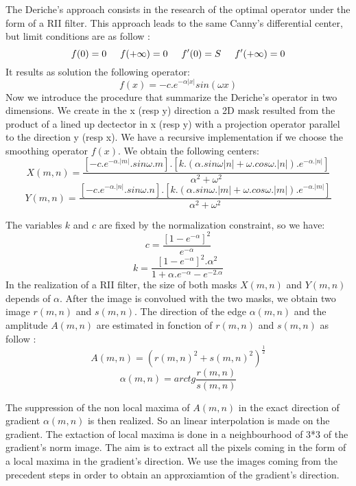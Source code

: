 The Deriche's approach consists in the research of the optimal operator under the form of a RII filter. This approach leads to the same Canny's differential center, but limit conditions are as follow :
\[
f(0)=0 \hspace{0.5cm}  f(+\infty)=0 \hspace{0.5cm}  f'(0)=S \hspace{0.5cm}  f'(+\infty)=0 
\]
It results as solution the following operator:
\[
f(x) = -c.e^{-\alpha |x|}sin(\omega x) 
\]
Now we introduce the procedure that summarize the Deriche's operator in two dimensions. We create in the x (resp y) direction a 2D mask resulted from the product of a lined up dectector in x (resp y) with a projection operator parallel to the direction y (resp x). We have a recursive implementation if we choose the smoothing operator $f(x)$.
We obtain the following centers:
\[
X(m,n)=\frac {[-c.e^{-\alpha .|m|}.sin\omega .m].[k.(\alpha .sin\omega |n|+\omega .cos \omega .|n|).e^{-\alpha .|n|}]}{\alpha ^{2}+\omega ^{2}} 
\]
\[
Y(m,n)=\frac {[-c.e^{-\alpha .|n|}.sin \omega .n].[k.(\alpha .sin\omega .|m|+\omega .cos\omega .|m|).e^{-\alpha .|m|}]}{\alpha ^{2}+\omega ^{2}} 
\]

The variables $k$ and $c$ are fixed by the normalization constraint, so we have:
\[
c=\frac {[1-e^{-\alpha }]^{2}}{e^{-\alpha } } 
\]
\[
k=\frac{[1-e^{-\alpha }]^{2}.\alpha ^{2}}{1+\alpha .e^{-\alpha}-e^{-2.\alpha}}
\]
In the realization of a RII filter, the size of both masks $X(m,n)$ and $Y(m,n)$ depends of $\alpha$. After the image is convolued with the two masks, we obtain two image  $r(m,n)$ and $s(m,n)$. The direction of the edge $\alpha (m,n)$ and the amplitude $A(m,n)$ are estimated in fonction of $r(m,n)$ and $s(m,n)$ as follow :
\[
A(m,n)=(r(m,n)^{2}+s(m,n)^{2})^{\frac{1}{2}}
\]
\[
\alpha (m,n)=arctg\frac {r(m,n)}{s(m,n)} 
\]

The suppression of the non local maxima of $A(m,n)$ in the exact direction of gradient $\alpha (m,n)$ is then realized. So an linear interpolation is made on the gradient. 
The extaction of local maxima is done in a neighbourhood of 3*3 of the gradient's norm image. The aim is to extract all the pixels coming in the form of a local maxima in the gradient's direction. We use the images coming from the precedent steps in order to obtain an approxiamtion of the gradient's direction.

